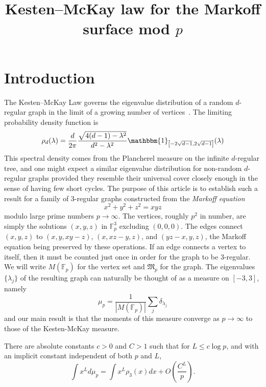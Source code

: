 \documentclass[AHL, Unicode, longabstracts, published]{cedram}
\title[Kesten--McKay law for the Markoff surface mod $p$]{Kesten--McKay law for the Markoff surface mod $p$}
\author{\firstname{Matthew} \lastname{de Courcy-Ireland}}
\author{\firstname{Michael} \lastname{Magee}}
\newcommand{\F}{\mathbb{F}}
\begin{document}
\maketitle



\section{Introduction}\label{sec:introduction}

The Kesten--McKay Law governs the eigenvalue distribution of a random $d$-regular graph in the limit of a growing number of vertices~\cite{K,M}. The limiting probability density function is
\begin{equation}
\rho_d(\lambda) = \frac{d}{2\pi} \frac{ \sqrt{4(d-1) - \lambda^2} }{d^2 - \lambda^2} \mathbbm{1}_{\left[-2\sqrt{d-1},2\sqrt{d-1}\right]}(\lambda)
\end{equation}
This spectral density comes from the Plancherel measure on the infinite $d$-regular tree, and one might expect a similar eigenvalue distribution for non-random $d$-regular graphs provided they resemble their universal cover closely enough in the sense of having few short cycles. The purpose of this article is to establish such a result for a family of 3-regular graphs constructed from the \emph{Markoff equation}
\begin{equation}\label{eqn:markoff}
x^2+y^2+z^2=xyz
\end{equation}
modulo large prime numbers $p \rightarrow \infty$. The vertices, roughly $p^2$ in number, are simply the solutions $(x,y,z)$ in $\F_p^3$ excluding $(0,0,0)$. The edges connect $(x,y,z)$ to $(x,y,xy-z)$, $(x, xz-y, z)$, and $(yz-x,y,z)$, the Markoff equation being preserved by these operations. If an edge connects a vertex to itself, then it must be counted just once in order for the graph to be 3-regular. We will write $M(\F_p)$ for the vertex set and $\mathfrak{M}_p$ for the graph. The eigenvalues $\{ \lambda_j \}$ of the resulting graph can naturally be thought of as a measure on $[-3,3]$, namely
\begin{equation}\label{eqn:empirical}
\mu_p = \frac{1}{|M(\F_p)|} \sum_j \delta_{\lambda_j}
\end{equation}
and our main result is that the moments of this measure converge as $p \rightarrow \infty$ to those of the Kesten-McKay measure.
\begin{theo}\label{thm:logp}
There are absolute constants $c>0$ and $C > 1$ such that for $L \leq c \log{p}$, and with an implicit constant independent of both $p$ and $L$,
\[
\int x^L d\mu_p = \int x^L \rho_3(x) dx + O\left(\frac{ C^L }{p} \right).
\]
\end{theo}
\end{document}
